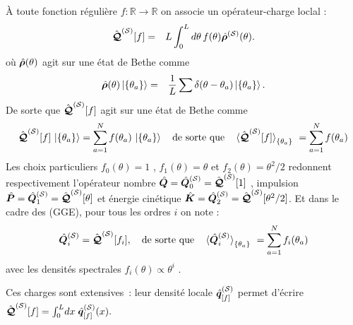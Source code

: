 À toute fonction régulière
\(
  f:\mathbb R\!\to\!\mathbb R
\)
on associe un opérateur-charge loclal :
\begin{eqnarray}\label{chap.2.charge.f.1}
	\hat{\bm{\mathcal{Q}}}^{(\mathcal{S})}[f] & = &  L \int_0^L d\theta \, f(\theta) \hat{\bm{\rho}}^{(\mathcal{S})}(\theta).	
\end{eqnarray}
où $\hat{\bm{\rho}}(\theta)$ agit sur une état de Bethe comme 
\begin{eqnarray}\label{chap.2.rho.1}
	 \hat{\bm{\rho}}(\theta) \ket{ \{ \theta_a \} } &=& \frac{1}{L} \sum \delta ( \theta - \theta_a ) \ket{ \{ \theta_a \} }.	
\end{eqnarray}
De sorte que $\hat{\bm{\mathcal{Q}}}^{(\mathcal{S})}[f]$ agit sur une état de Bethe comme
\begin{eqnarray}\label{chap.2.charge.1}
	\operator{\mathcal{Q}}^{(\mathcal{S})}[f]\,\ket{\{\theta_a\} } =  \sum_{a=1}^{N}f(\theta_a)\,\ket{\{\theta_a\} } \quad \mbox{de sorte que} \quad \braket{\operator{\mathcal{Q}}^{(\mathcal{S})}[f]}_{\{\theta_a\}} = \sum_{a=1}^N f(\theta_a)
\end{eqnarray}
Les choix particuliers
\(
  f_0(\theta)=1
\)
,
\(
  f_1(\theta)=\theta
\)
et
\(
  f_2(\theta)=\theta^{2}/2
\)
redonnent respectivement l'opérateur nombre \(\hat{\bm{Q}}=\hat{\bm{Q}}_0^{(\mathcal{S})} = \hat{\bm{\mathcal{Q}}}^{(\mathcal{S})}[1]\) , impulsion \(\hat{\bm{P}}=\hat{\bm{Q}}_1^{(\mathcal{S})} = \hat{\bm{\mathcal{Q}}}^{(\mathcal{S})}[\theta]\) et énergie cinétique
\(\hat{\bm{K}}=\hat{\bm{Q}}_2^{(\mathcal{S})} = \hat{\bm{\mathcal{Q}}}^{(\mathcal{S})}[\theta^2/2]\). Et dans le cadre des (GGE), pour tous les ordres $i$ on note :
\begin{eqnarray}\label{chap.2.charge.ordre.i.1}
	\operator{Q}^{(\mathcal{S})}_i = \operator{\mathcal{Q}}^{(\mathcal{S})}[f_i]	, \quad \mbox{de sorte que} \quad \braket{\operator{Q}^{(\mathcal{S})}_i}_{\{\theta_a\}} = \sum_{a=1}^N f_i(\theta_a)  
\end{eqnarray}
avec les densités spectrales $f_i(\theta) \propto \theta^i$ . 

Ces charges sont extensives : leur densité locale $\hat{\bm{q}}^{(\mathcal{S})}_{[f]}$ permet d’écrire
\(
  \hat{\bm{\mathcal{Q}}}^{(\mathcal{S})}[f]=\int_0^{L}\!dx\;\hat{\bm{q}}^{(\mathcal{S})}_{[f]}(x).
\)

